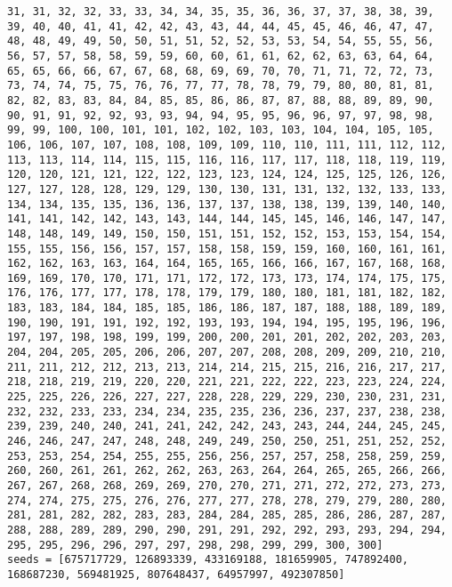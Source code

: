 \begin{lstlisting}[label={lst:call300vehicle90},caption=Optimal solution call\_300\_vehicle\_90]
31, 31, 32, 32, 33, 33, 34, 34, 35, 35, 36, 36, 37, 37, 38, 38, 39, 39, 40, 40, 41, 41, 42, 42, 43, 43, 44, 44, 45, 45, 46, 46, 47, 47, 48, 48, 49, 49, 50, 50, 51, 51, 52, 52, 53, 53, 54, 54, 55, 55, 56, 56, 57, 57, 58, 58, 59, 59, 60, 60, 61, 61, 62, 62, 63, 63, 64, 64, 65, 65, 66, 66, 67, 67, 68, 68, 69, 69, 70, 70, 71, 71, 72, 72, 73, 73, 74, 74, 75, 75, 76, 76, 77, 77, 78, 78, 79, 79, 80, 80, 81, 81, 82, 82, 83, 83, 84, 84, 85, 85, 86, 86, 87, 87, 88, 88, 89, 89, 90, 90, 91, 91, 92, 92, 93, 93, 94, 94, 95, 95, 96, 96, 97, 97, 98, 98, 99, 99, 100, 100, 101, 101, 102, 102, 103, 103, 104, 104, 105, 105, 106, 106, 107, 107, 108, 108, 109, 109, 110, 110, 111, 111, 112, 112, 113, 113, 114, 114, 115, 115, 116, 116, 117, 117, 118, 118, 119, 119, 120, 120, 121, 121, 122, 122, 123, 123, 124, 124, 125, 125, 126, 126, 127, 127, 128, 128, 129, 129, 130, 130, 131, 131, 132, 132, 133, 133, 134, 134, 135, 135, 136, 136, 137, 137, 138, 138, 139, 139, 140, 140, 141, 141, 142, 142, 143, 143, 144, 144, 145, 145, 146, 146, 147, 147, 148, 148, 149, 149, 150, 150, 151, 151, 152, 152, 153, 153, 154, 154, 155, 155, 156, 156, 157, 157, 158, 158, 159, 159, 160, 160, 161, 161, 162, 162, 163, 163, 164, 164, 165, 165, 166, 166, 167, 167, 168, 168, 169, 169, 170, 170, 171, 171, 172, 172, 173, 173, 174, 174, 175, 175, 176, 176, 177, 177, 178, 178, 179, 179, 180, 180, 181, 181, 182, 182, 183, 183, 184, 184, 185, 185, 186, 186, 187, 187, 188, 188, 189, 189, 190, 190, 191, 191, 192, 192, 193, 193, 194, 194, 195, 195, 196, 196, 197, 197, 198, 198, 199, 199, 200, 200, 201, 201, 202, 202, 203, 203, 204, 204, 205, 205, 206, 206, 207, 207, 208, 208, 209, 209, 210, 210, 211, 211, 212, 212, 213, 213, 214, 214, 215, 215, 216, 216, 217, 217, 218, 218, 219, 219, 220, 220, 221, 221, 222, 222, 223, 223, 224, 224, 225, 225, 226, 226, 227, 227, 228, 228, 229, 229, 230, 230, 231, 231, 232, 232, 233, 233, 234, 234, 235, 235, 236, 236, 237, 237, 238, 238, 239, 239, 240, 240, 241, 241, 242, 242, 243, 243, 244, 244, 245, 245, 246, 246, 247, 247, 248, 248, 249, 249, 250, 250, 251, 251, 252, 252, 253, 253, 254, 254, 255, 255, 256, 256, 257, 257, 258, 258, 259, 259, 260, 260, 261, 261, 262, 262, 263, 263, 264, 264, 265, 265, 266, 266, 267, 267, 268, 268, 269, 269, 270, 270, 271, 271, 272, 272, 273, 273, 274, 274, 275, 275, 276, 276, 277, 277, 278, 278, 279, 279, 280, 280, 281, 281, 282, 282, 283, 283, 284, 284, 285, 285, 286, 286, 287, 287, 288, 288, 289, 289, 290, 290, 291, 291, 292, 292, 293, 293, 294, 294, 295, 295, 296, 296, 297, 297, 298, 298, 299, 299, 300, 300]
seeds = [675717729, 126893339, 433169188, 181659905, 747892400, 168687230, 569481925, 807648437, 64957997, 492307850]
\end{lstlisting}%
\clearpage


